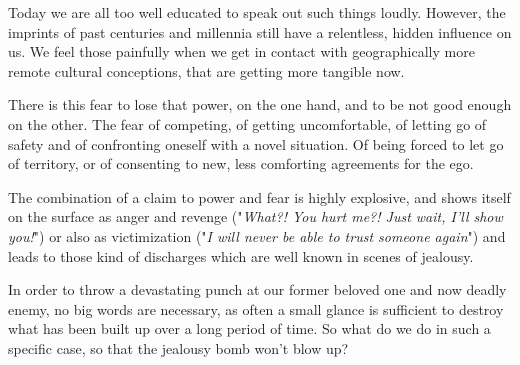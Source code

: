 Today we are all too well educated to speak out such things loudly. However, the imprints of past centuries and millennia still have a relentless, hidden influence on us. We feel those painfully when we get in contact with geographically more remote cultural conceptions, that are getting more tangible now.

There is this fear to lose that power, on the one hand, and to be not good enough on the other.  The fear of competing, of getting uncomfortable, of letting go of safety and of confronting oneself with a novel situation. Of being forced to let go of territory, or of consenting to new, less comforting agreements for the ego.

The combination of a claim to power and fear is highly explosive, and shows itself on the surface as anger and revenge ("\textit{What?! You hurt me?! Just wait, I'll show you!}") or also as victimization ("\textit{I will never be able to trust someone again}") and leads to those kind of discharges which are well known in scenes of jealousy.

In order to throw a devastating punch at our former beloved one and now deadly enemy, no big words are necessary, as often a small glance is sufficient to destroy what has been built up over a long period of time. So what do we do in such a specific case, so that the jealousy bomb won't blow up?

